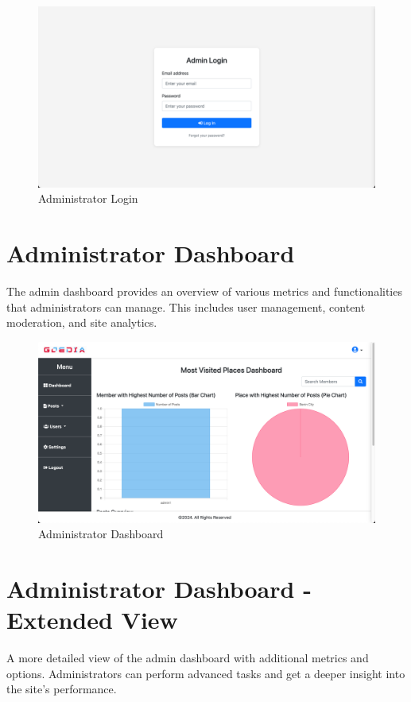 \begin{figure}[H]
    \centering
    \includegraphics[width=\textwidth]{adminLogin.png}
    \caption{Administrator Login}
    \label{fig:adminLogin}
\end{figure}

\section{Administrator Dashboard}
The admin dashboard provides an overview of various metrics and functionalities that administrators can manage. This includes user management, content moderation, and site analytics.

\begin{figure}[H]
    \centering
    \includegraphics[width=\textwidth]{adminDash.png}
    \caption{Administrator Dashboard}
    \label{fig:adminDash}
\end{figure}

\section{Administrator Dashboard - Extended View}
A more detailed view of the admin dashboard with additional metrics and options. Administrators can perform advanced tasks and get a deeper insight into the site's performance.


